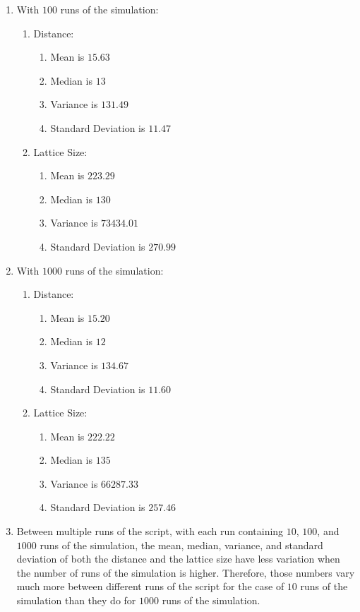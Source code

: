 \documentclass[12pt]{article}
\begin{document}
\begin{enumerate}
 	\item With $100$ runs of the simulation:
    	\begin{enumerate}
    	\item Distance:
        	\begin{enumerate}
        	\item Mean is $15.63$
            \item Median is $13$
            \item Variance is $131.49$
            \item Standard Deviation is $11.47$
        	\end{enumerate}
       	\item Lattice Size:
        	\begin{enumerate}
        	\item Mean is $223.29$
            \item Median is $130$
            \item Variance is $73434.01$
            \item Standard Deviation is $270.99$
        	\end{enumerate}
    	\end{enumerate}
 	\item With $1000$ runs of the simulation:
    	\begin{enumerate}
    	\item Distance:
        	\begin{enumerate}
        	\item Mean is $15.20$
            \item Median is $12$
            \item Variance is $134.67$
            \item Standard Deviation is $11.60$
        	\end{enumerate}
       	\item Lattice Size:
        	\begin{enumerate}
        	\item Mean is $222.22$
            \item Median is $135$
            \item Variance is $66287.33$
            \item Standard Deviation is $257.46$
        	\end{enumerate}
    	\end{enumerate}
   	\item Between multiple runs of the script, with each run containing $10$, $100$, and $1000$ runs of the simulation, the mean, median, variance, and standard deviation of both the distance and the lattice size have less variation when the number of runs of the simulation is higher. Therefore, those numbers vary much more between different runs of the script for the case of $10$ runs of the simulation than they do for $1000$ runs of the simulation.

	\end{enumerate}
\end{document}
